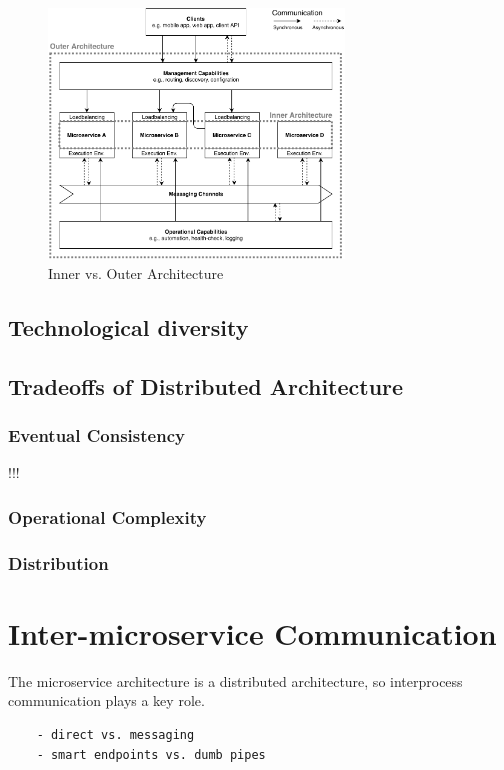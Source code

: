 \documentclass[thesis=M,english,hidelinks]{FITthesis}[2012/10/20]
\begin{document}
\begin{figure}
  \centering
    \includegraphics[width=0.7\textwidth]{images/architecture_inner_vs_outer.pdf}
    \caption{Inner vs. Outer Architecture}
  \label{fig:in-vs-out-arch}
\end{figure}




\subsection{Technological diversity}


\subsection{Tradeoffs of Distributed Architecture}
\subsubsection{Eventual Consistency}
!!!
\subsubsection{Operational Complexity}
\subsubsection{Distribution}




% 
% 

\section{Inter-microservice Communication}
The microservice architecture is a distributed architecture, so interprocess communication plays a key role.
\begin{verbatim}
    - direct vs. messaging
    - smart endpoints vs. dumb pipes
\end{verbatim}
\end{document}
